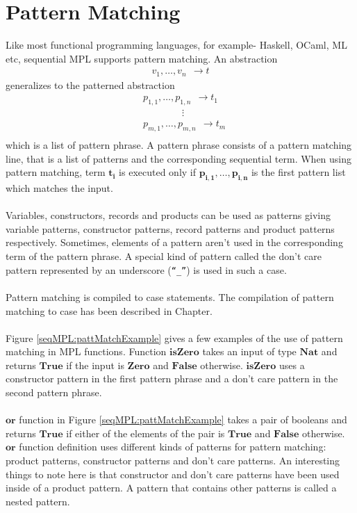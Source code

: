 \documentclass[11pt]{article}
\begin{document}
\section{Pattern Matching}\label {SeqMPL:IntPmatch}
Like most functional programming languages, for example- Haskell, OCaml, ML etc, sequential MPL supports pattern matching. An abstraction
\begin{align*}
  v_1,\ldots,v_n~~\to t 
\end{align*}
generalizes to the patterned abstraction
\begin{align*}
  &p_{1,1},\ldots,p_{1,n}~~\to t_1\\
  &\qquad \qquad\vdots \\
  &p_{m,1},\ldots,p_{m,n}~~\to t_m\\
\end{align*}
which is a list of pattern phrase. A pattern phrase consists of a  pattern matching line, that is a list of patterns and the corresponding sequential term. When using pattern matching, term $\mathbf{t_i}$ is executed only if $\mathbf{p_{i,1},\ldots,p_{i,n}}$ is the first pattern list which matches the input.
~~\\~~\\
Variables, constructors, records and products can be used as patterns giving variable patterns, constructor patterns, record patterns and product patterns respectively. Sometimes, elements of a pattern aren't used in the corresponding term of the pattern phrase. A special kind of pattern called the don't care pattern represented by an underscore (\texttt{``\_''}) is used in such a case.  
~~\\~~\\
Pattern matching is compiled to {\sf case} statements. The compilation of pattern matching to case has been described in Chapter.
~~\\~~\\ 
Figure \ref {seqMPL:pattMatchExample} gives a few examples of the use of pattern matching in MPL functions. Function $\mathbf{isZero}$ takes an input of type $\mathbf{Nat}$ and returns $\mathbf{True}$ if the input is $\mathbf{Zero}$ and $\mathbf{False}$ otherwise. $\mathbf{isZero}$ uses a constructor pattern in the first pattern phrase and a don't care pattern in the second pattern phrase.
~~\\~~\\ 
$\mathbf{or}$ function in Figure \ref{seqMPL:pattMatchExample} takes a pair of booleans and returns $\mathbf{True}$ if either of the elements of the pair is $\mathbf{True}$ and $\mathbf{False}$ otherwise. $\mathbf{or}$ function definition uses different kinds of patterns for pattern matching: product patterns, constructor patterns and don't care patterns. An interesting things to note here is that constructor and don't care patterns have been used inside of a product pattern. A pattern that contains other patterns is called a nested pattern. 
\end{document}
